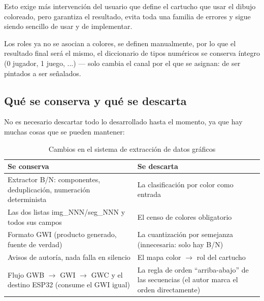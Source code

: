 Esto exige más intervención del usuario que define el cartucho que usar el dibujo coloreado, pero garantiza el resultado, evita toda una familia de errores y sigue siendo sencillo de usar y de implementar.

Los roles ya no se asocian a colores, se definen manualmente, por lo que el resultado final será el mismo, el diccionario de tipos numéricos se conserva íntegro (0 jugador, 1 juego, ...) — solo cambia el canal por el que se asignan: de ser pintados a ser señalados.

\subsection{Qué se conserva y qué se descarta}

No es necesario descartar todo lo desarrollado hasta el momento, ya que hay muchas cosas que se pueden mantener:

\begin{table}[htbp]
	\centering
	\begin{tabularx}{\textwidth}{>{\raggedright\arraybackslash}X >{\raggedright\arraybackslash}X}
		\toprule
		\textbf{Se conserva} & \textbf{Se descarta} \\ 
		\midrule
		Extractor B/N: componentes, deduplicación, numeración determinista & La clasificación por color como entrada \\ \addlinespace
		Las dos listas img\_NNN/seg\_NNN y todos sus campos & El censo de colores obligatorio \\ \addlinespace
		Formato GWI (producto generado, fuente de verdad) & La cuantización por semejanza (innecesaria: solo hay B/N) \\ \addlinespace
		Avisos de autoría, nada falla en silencio & El mapa color $\rightarrow$ rol del cartucho \\ \addlinespace
		Flujo GWB $\rightarrow$ GWI $\rightarrow$ GWC y el destino ESP32 (consume el GWI igual) & La regla de orden ``arriba-abajo'' de las secuencias (el autor marca el orden directamente) \\ 
		\bottomrule
	\end{tabularx}
	\caption{Cambios en el sistema de extracción de datos gráficos}
	\label{tab:cambiosExtraccion}
\end{table}

